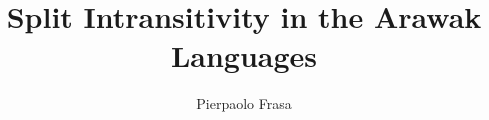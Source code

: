 \documentclass[a4paper]{scrreprt}
\author{Pierpaolo Frasa}
\title{Split Intransitivity in the Arawak Languages}
\begin{document}
\titleMS

\tableofcontents


\end{document}
